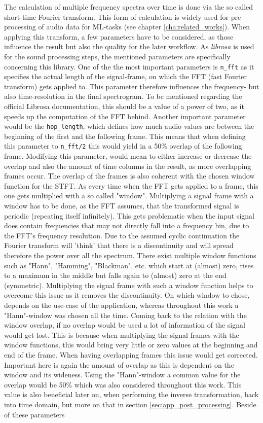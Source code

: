 The calculation of multiple frequency spectra over time is done via the so called short-time Fourier transform. This form of calculation is widely used for pre-processing of audio data for ML-tasks (see chapter \ref{cha:related_works}). When applying this transform, a few parameters have to be considered, as those influence the result but also the quality for the later workflow. As \textit{librosa} is used for the sound processing steps, the mentioned parameters are specifically concerning this library. One of the the most important parameters is \texttt{n\_fft} as it specifies the actual length of the signal-frame, on which the FFT (fast Fourier transform) gets applied to. This parameter therefore influences the frequency- but also time-resolution in the final spectrogram. To be mentioned regarding the official Librosa documentation, this should be a value of a power of two, as it speeds up the computation of the FFT behind. Another important parameter would be the \texttt{hop\_length}, which defines how much audio values are between the beginning of the first and the following frame. This means that when defining this parameter to \texttt{n\_fft/2} this would yield in a 50\% overlap of the following frame. Modifying this parameter, would mean to either increase or decrease the overlap and also the amount of time columns in the result, as more overlapping frames occur. The overlap of the frames is also coherent with the chosen window function for the STFT. As every time when the FFT gets applied to a frame, this one gets multiplied with a so called "window". Multiplying a signal frame with a window has to be done, as the FFT assumes, that the transformed signal is periodic (repeating itself infinitely). \cite{heinzel2002spectrum} This gets problematic when the input signal does contain frequencies that may not directly fall into a frequency bin, due to the FFT's frequency resolution. Due to the assumed cyclic continuation the Fourier transform will 'think' that there is a discontinuity and will spread therefore the power over all the spectrum. There exist multiple window functions such as "Hann", "Hamming", "Blackman", etc. which start at (almost) zero, rises to a maximum in the middle but falls again to (almost) zero at the end (symmetric). Multiplying the signal frame with such a window function helps to overcome this issue as it removes the discontinuity. On which window to chose, depends on the use-case of the application, whereas throughout this work a "Hann"-window was chosen all the time. Coming back to the relation with the window overlap, if no overlap would be used a lot of information of the signal would get lost. This is because when multiplying the signal frames with the window functions, this would bring very little or zero values at the beginning and end of the frame. \cite{heinzel2002spectrum} When having overlapping frames this issue would get corrected. Important here is again the amount of overlap as this is dependent on the window and its wideness. Using the "Hann"-window a common value for the overlap would be 50\% which was also considered throughout this work. This value is also beneficial later on, when performing the inverse transformation, back into time domain, but more on that in section \ref{sec:app_post_processing}. Beside of these parameters 